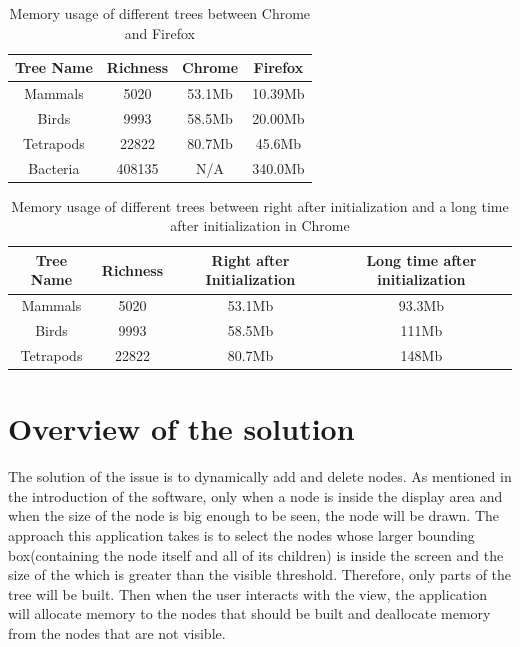 \documentclass[MSc]{icldt}
\begin{document}
 \begin{table} [H]
	\centering %
	\begin{tabular}{|c c c c|} %
		\hline %
		Tree Name & Richness  & Chrome & Firefox\\ %
		\hline  %
		Mammals & 5020 &  53.1Mb & 10.39Mb\\  %
		\hline
		Birds & 9993 &  58.5Mb & 20.00Mb\\
		\hline
		Tetrapods & 22822 & 80.7Mb & 45.6Mb\\ 
		\hline %
		Bacteria & 408135 & N/A & 340.0Mb \\ [1ex] %
		\hline
	\end{tabular}
	\label{table:nonlin} %
	\caption{Memory usage of different trees between Chrome and Firefox} %
\end{table}

\begin{table} [H]
	\centering %
	\begin{tabular}{|c c c c|} %
		\hline %
		Tree Name & Richness  & Right after Initialization & Long time after initialization\\ %
		\hline  %
		Mammals & 5020 &  53.1Mb & 93.3Mb\\  %
		\hline
		Birds & 9993 &  58.5Mb & 111Mb\\
		\hline
		Tetrapods & 22822 & 80.7Mb & 148Mb\\  [1ex] %
		\hline
	\end{tabular}
	\label{table:nonlin} %
	\caption{Memory usage of different trees between right after initialization and a long time after 
	initialization in Chrome } %
\end{table}


\section{Overview of the solution}

The solution of the issue is to dynamically add and delete nodes. As mentioned in the introduction of the software, only when a node is inside the display area and when the size of the node is big enough to be seen, the node will be drawn. The approach this application takes is to select the nodes whose larger bounding box(containing the node itself and all of its children) is inside the screen and the size of the which is greater than the visible threshold. Therefore, only parts of the tree will be built. Then when the user interacts with the view, the application will allocate memory to the nodes that should be built and deallocate memory from the nodes that are not visible.
\end{document}
